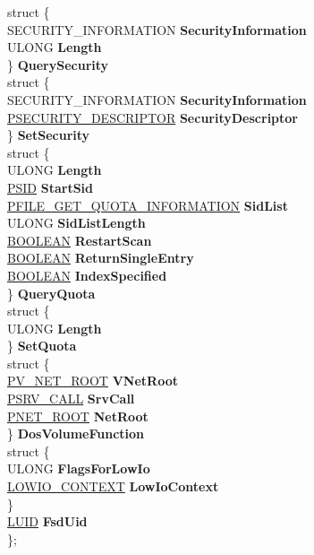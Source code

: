 \begin{DoxyCompactItemize}
\begin{tabbing}
\>struct \{\\
\>\>SECURITY\_INFORMATION {\bfseries SecurityInformation}\\
\>\>ULONG {\bfseries Length}\\
\>\} {\bfseries QuerySecurity}\\
\>struct \{\\
\>\>SECURITY\_INFORMATION {\bfseries SecurityInformation}\\
\>\>\hyperlink{struct___s_e_c_u_r_i_t_y___d_e_s_c_r_i_p_t_o_r}{PSECURITY\_DESCRIPTOR} {\bfseries SecurityDescriptor}\\
\>\} {\bfseries SetSecurity}\\
\>struct \{\\
\>\>ULONG {\bfseries Length}\\
\>\>\hyperlink{struct___s_i_d}{PSID} {\bfseries StartSid}\\
\>\>\hyperlink{struct___f_i_l_e___g_e_t___q_u_o_t_a___i_n_f_o_r_m_a_t_i_o_n}{PFILE\_GET\_QUOTA\_INFORMATION} {\bfseries SidList}\\
\>\>ULONG {\bfseries SidListLength}\\
\>\>\hyperlink{_processor_bind_8h_a112e3146cb38b6ee95e64d85842e380a}{BOOLEAN} {\bfseries RestartScan}\\
\>\>\hyperlink{_processor_bind_8h_a112e3146cb38b6ee95e64d85842e380a}{BOOLEAN} {\bfseries ReturnSingleEntry}\\
\>\>\hyperlink{_processor_bind_8h_a112e3146cb38b6ee95e64d85842e380a}{BOOLEAN} {\bfseries IndexSpecified}\\
\>\} {\bfseries QueryQuota}\\
\>struct \{\\
\>\>ULONG {\bfseries Length}\\
\>\} {\bfseries SetQuota}\\
\>struct \{\\
\>\>\hyperlink{struct___v___n_e_t___r_o_o_t}{PV\_NET\_ROOT} {\bfseries VNetRoot}\\
\>\>\hyperlink{struct___s_r_v___c_a_l_l}{PSRV\_CALL} {\bfseries SrvCall}\\
\>\>\hyperlink{struct___n_e_t___r_o_o_t}{PNET\_ROOT} {\bfseries NetRoot}\\
\>\} {\bfseries DosVolumeFunction}\\
\mbox{\label{union___r_x___c_o_n_t_e_x_t_1_1_0D1785_a86f73627c9eea5adfe571b631fa944ef}} 
\>struct \{\\
\>\>ULONG {\bfseries FlagsForLowIo}\\
\>\>\hyperlink{struct___l_o_w_i_o___c_o_n_t_e_x_t}{LOWIO\_CONTEXT} {\bfseries LowIoContext}\\
\>\} \\
\>\hyperlink{struct___l_u_i_d}{LUID} {\bfseries FsdUid}\\
\}; \\


\end{tabbing}
\end{DoxyCompactItemize}

